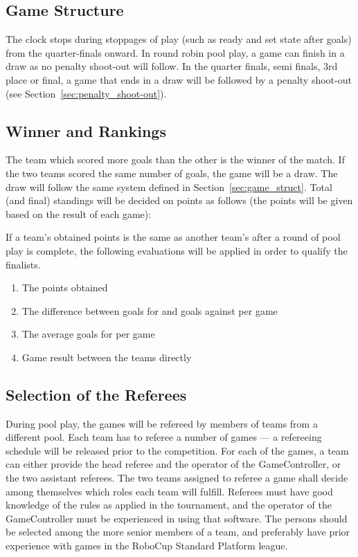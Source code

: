 \documentclass[12pt]{article}
\begin{document}
\subsection{Game Structure}

The clock stops during stoppages of play (such as ready and set state after goals) from the quarter-finals onward.  In round robin pool play, a game can finish in a draw as no penalty shoot-out will follow. In the quarter finals, semi finals, 3rd place or final, a game that ends in a draw will be followed by a penalty shoot-out (see Section~\ref{sec:penalty_shoot-out}).

\subsection{Winner and Rankings}

The team which scored more goals than the other is the winner of the match. If the two teams scored the same number of goals, the game will be a draw. The draw will follow the same system defined in Section~\ref{sec:game_struct}. Total (and final) standings will be decided on points as follows (the points will be given based on the result of each game):


If a team's obtained points is the same as another team's after a round of pool play is complete, the following evaluations will be applied in order to qualify the finalists.

\begin{enumerate}

\item The points obtained

\item The difference between goals for and goals against per game

\item The average goals for per game

\item Game result between the teams directly

\end{enumerate}

\subsection{Selection of the Referees}
\label{sec:refSelection}
During pool play, the games will be refereed by members of teams from a different pool.  Each team has to referee a number of games --- a refereeing schedule will be released prior to the competition. For each of the games, a team can either provide the head referee and the operator of the GameController, or the two assistant referees.  The two teams assigned to referee a game shall decide among themselves which roles each team will fulfill.  Referees must have good knowledge of the rules as applied in the tournament, and the operator of the GameController must be experienced in using that software. The persons should be selected among the more senior members of a team, and preferably have prior experience with games in the RoboCup Standard Platform league.
\end{document}
